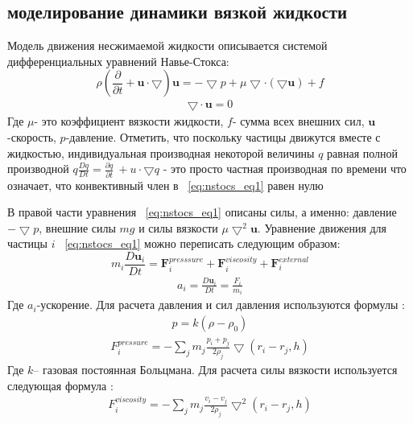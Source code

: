 \subsection{моделирование динамики вязкой жидкости}\label{subsec:ch1/sec4/sub1}

Модель движения несжимаемой жидкости описывается системой дифференциальных уравнений Навье-Стокса:
\begin{equation}
\label{eq:nstocs_eq1}
\rho \left ( \frac{\partial }{\partial t} + \mathbf{u} \cdot \bigtriangledown \right )\mathbf{u}=-\bigtriangledown p + \mu \bigtriangledown \cdot (\bigtriangledown \mathbf{u})+f
\end{equation}
\begin{align}
\bigtriangledown \cdot \mathbf{u} = 0 \nonumber
\end{align}
Где \(\mu\)- это коэффициент вязкости жидкости, \(f\)- сумма всех внешних сил, \(\mathbf{u}\)-скорость, \(p\)-давление. Отметить, что поскольку частицы движутся вместе с жидкостью, индивидуальная производная некоторой величины \(q\) равная полной производной \(q\frac{Dq}{Dt}=\frac{\partial q}{\partial t}\ + u \cdot \bigtriangledown q\) - это просто частная производная по времени что означает, что конвективный член в ~\ref{eq:nstocs_eq1} равен нулю \cite {Müller2003, Sedov1970}

В правой части уравнения ~\ref{eq:nstocs_eq1} описаны силы, а именно: давление \(-\bigtriangledown p\), внешние силы \(mg\) и силы вязкости \( \mu \bigtriangledown^{2}\mathbf{u} \). Уравнение движения для частицы \(i\) ~\ref{eq:nstocs_eq1} можно переписать следующим образом:
\begin{equation}
\label{eq:common_disk}
m_i\frac{D\mathbf{u}_i}{Dt}=\mathbf{F}_i^{presssure} + \mathbf{F}_i^{viscosity} + \mathbf{F}_i^{external}
\end{equation}
\begin{align}
a_i=\frac{D\mathbf{u}_i}{Dt}=\frac{F_i}{m_i} \nonumber
\end{align}
Где \(a_i\)-ускорение. Для расчета давления и сил давления используются формулы \cite {Müller2003}:
\begin{align}
p=k(\rho - \rho_0) \nonumber 
\end{align}
\begin{align}
F_{i}^{pressure}=-\sum_{j}m_j\frac{p_i+p_j}{2 \rho_j}\bigtriangledown(r_i-r_j, h) \nonumber
\end{align}
Где \(k\)– газовая постоянная Больцмана. Для расчета силы вязкости используется следующая формула \cite {Müller2003}:
\begin{align}
F_{i}^{viscosity}=-\sum_{j}m_j\frac{v_i-v_j}{2 \rho_j}\bigtriangledown^{2}(r_i-r_j, h) \nonumber
\end{align}


